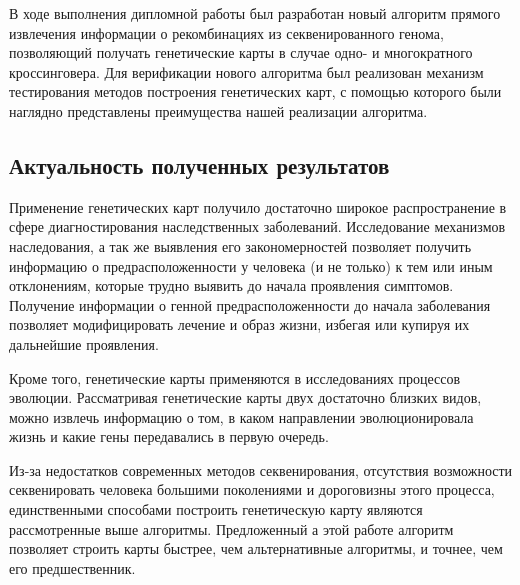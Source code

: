 \documentclass{matmex-diploma-custom}
\begin{document}
В ходе выполнения дипломной работы был разработан новый алгоритм
прямого извлечения информации о рекомбинациях из секвенированного
генома, позволяющий получать генетические карты в случае одно- и
многократного кроссинговера.  Для верификации нового алгоритма был
реализован механизм тестирования методов построения генетических карт,
с помощью которого были наглядно представлены преимущества нашей
реализации алгоритма.

\subsection*{Актуальность полученных результатов}

Применение генетических карт получило достаточно широкое
распространение в сфере диагностирования наследственных
заболеваний. Исследование механизмов наследования, а так же выявления
его закономерностей позволяет получить информацию о
предрасположенности у человека (и не только) к тем или иным
отклонениям, которые трудно выявить до начала проявления
симптомов. Получение информации о генной предрасположенности до начала
заболевания позволяет модифицировать лечение и образ жизни, избегая
или купируя их дальнейшие проявления.

Кроме того, генетические карты применяются в исследованиях процессов
эволюции. Рассматривая генетические карты двух достаточно близких
видов, можно извлечь информацию о том, в каком направлении
эволюционировала жизнь и какие гены передавались в первую очередь.

Из-за недостатков современных методов секвенирования, отсутствия
возможности секвенировать человека большими поколениями и дороговизны
этого процесса, единственными способами построить генетическую карту
являются рассмотренные выше алгоритмы. Предложенный а этой работе
алгоритм позволяет строить карты быстрее, чем альтернативные
алгоритмы, и точнее, чем его предшественник.

\clearpage
{}


\end{document}
